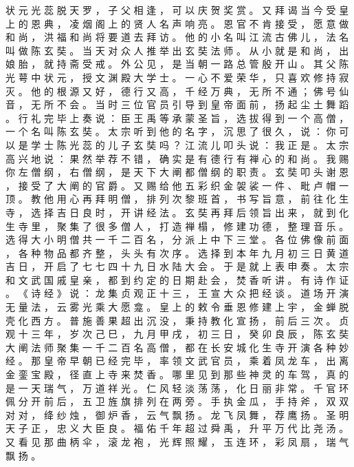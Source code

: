 {状 元 光 蕊 脱 天 罗 ， 子 父 相 逢 ， 可 以 庆 贺 奖 赏 。
又 拜 谒 当 今 受 皇 上 的 恩 典 ， 凌 烟 阁 上 的 贤 人 名 声 响 亮 。
恩 官 不 肯 接 受 ， 愿 意 做 和 尚 ， 洪 福 和 尚 将 要 道 去 拜 访 。
他 的 小 名 叫 江 流 古 佛 儿 ， 法 名 叫 做 陈 玄 奘 。
当 天 对 众 人 推 举 出 玄 奘 法 师 。
从 小 就 是 和 尚 ， 出 娘 胎 ， 就 持 斋 受 戒 。
外 公 见 ， 是 当 朝 一 路 总 管 殷 开 山 。
其 父 陈 光 萼 中 状 元 ， 授 文 渊 殿 大 学 士 。
一 心 不 爱 荣 华 ， 只 喜 欢 修 持 寂 灭 。
他 的 根 源 又 好 ， 德 行 又 高 ， 千 经 万 典 ， 无 所 不 通 ； 佛 号 仙 音 ， 无 所 不 会 。
当 时 三 位 官 员 引 导 到 皇 帝 面 前 ， 扬 起 尘 土 舞 蹈 。
行 礼 完 毕 上 奏 说 ： 臣 王 禹 等 承 蒙 圣 旨 ， 选 拔 得 到 一 个 高 僧 ， 一 个 名 叫 陈 玄 奘 。
太 宗 听 到 他 的 名 字 ， 沉 思 了 很 久 ， 说 ： 你 可 以 是 学 士 陈 光 蕊 的 儿 子 玄 奘 吗 ？ 江 流 儿 叩 头 说 ： 我 正 是 。
太 宗 高 兴 地 说 ： 果 然 举 荐 不 错 ， 确 实 是 有 德 行 有 禅 心 的 和 尚 。
我 赐 你 左 僧 纲 ， 右 僧 纲 ， 是 天 下 大 阐 都 僧 纲 的 职 责 。
玄 奘 叩 头 谢 恩 ， 接 受 了 大 阐 的 官 爵 。
又 赐 给 他 五 彩 织 金 袈 裟 一 件 、 毗 卢 帽 一 顶 。
教 他 用 心 再 拜 明 僧 ， 排 列 次 黎 班 首 ， 书 写 旨 意 ， 前 往 化 生 寺 ， 选 择 吉 日 良 时 ， 开 讲 经 法 。
玄 奘 再 拜 后 领 旨 出 来 ， 就 到 化 生 寺 里 ， 聚 集 了 很 多 僧 人 ， 打 造 禅 榻 ， 修 建 功 德 ， 整 理 音 乐 。
选 得 大 小 明 僧 共 一 千 二 百 名 ， 分 派 上 中 下 三 堂 。
各 位 佛 像 前 面 ， 各 种 物 品 都 齐 整 ， 头 头 有 次 序 。
选 择 到 本 年 九 月 初 三 日 黄 道 吉 日 ， 开 启 了 七 七 四 十 九 日 水 陆 大 会 。
于 是 就 上 表 申 奏 。
太 宗 和 文 武 国 戚 皇 亲 ， 都 到 约 定 的 日 期 赴 会 ， 焚 香 听 讲 。
有 诗 作 证 。
《 诗 经 》 说 ： 龙 集 贞 观 正 十 三 ， 王 宣 大 众 把 经 谈 。
道 场 开 演 无 量 法 ， 云 雾 光 乘 大 愿 龛 。
皇 上 的 敕 令 垂 恩 修 建 上 宇 ， 金 蝉 脱 壳 化 西 方 。
普 施 善 果 超 出 沉 没 ， 秉 持 教 化 宣 扬 ， 前 后 三 次 。
贞 观 十 三 年 ， 岁 次 己 巳 ， 九 月 甲 戌 ， 初 三 日 ， 癸 卯 良 辰 ， 陈 玄 奘 大 阐 法 师 聚 集 一 千 二 百 名 高 僧 ， 都 在 长 安 城 化 生 寺 开 演 各 种 妙 经 。
那 皇 帝 早 朝 已 经 完 毕 ， 率 领 文 武 官 员 ， 乘 着 凤 龙 车 ， 出 离 金 銮 宝 殿 ， 径 直 上 寺 来 焚 香 。
哪 里 见 到 那 些 神 灵 的 车 驾 ， 真 的 是 一 天 瑞 气 ， 万 道 祥 光 。
仁 风 轻 淡 荡 荡 ， 化 日 丽 非 常 。
千 官 环 佩 分 开 前 后 ， 五 卫 旌 旗 排 列 在 两 旁 。
手 执 金 瓜 ， 手 持 斧 ， 双 双 对 对 ， 绛 纱 烛 ， 御 炉 香 ， 云 气 飘 扬 。
龙 飞 凤 舞 ， 荐 鹰 扬 。
圣 明 天 子 正 ， 忠 义 大 臣 良 。
福 佑 千 年 超 过 舜 禹 ， 升 平 万 代 比 尧 汤 。
又 看 见 那 曲 柄 伞 ， 滚 龙 袍 ， 光 辉 照 耀 ， 玉 连 环 ， 彩 凤 扇 ， 瑞 气 飘 扬 。
}

